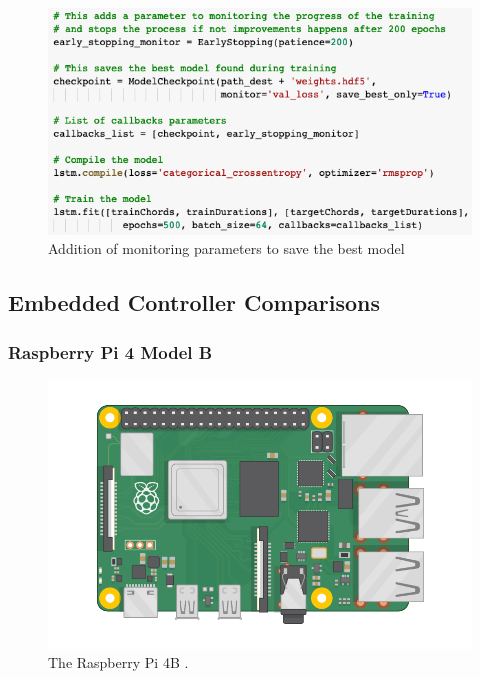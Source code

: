 \begin{figure}[h!]
  \includegraphics[width=\linewidth]{image/fig_JDF26.png}
  \caption{Addition of monitoring parameters to save the best model}
\end{figure}

\subsection{Embedded Controller Comparisons}
\label{sec:embedded_controllers}

\subsubsection{Raspberry Pi 4 Model B}

\begin{figure}[h!]
  \centering
  \includegraphics[width=\linewidth]{image/raspberry-pi.png}
  \caption{The Raspberry Pi 4B \autocite{raspberry-pi-4b}.}
  \label{fig:rpi4b}
\end{figure}

